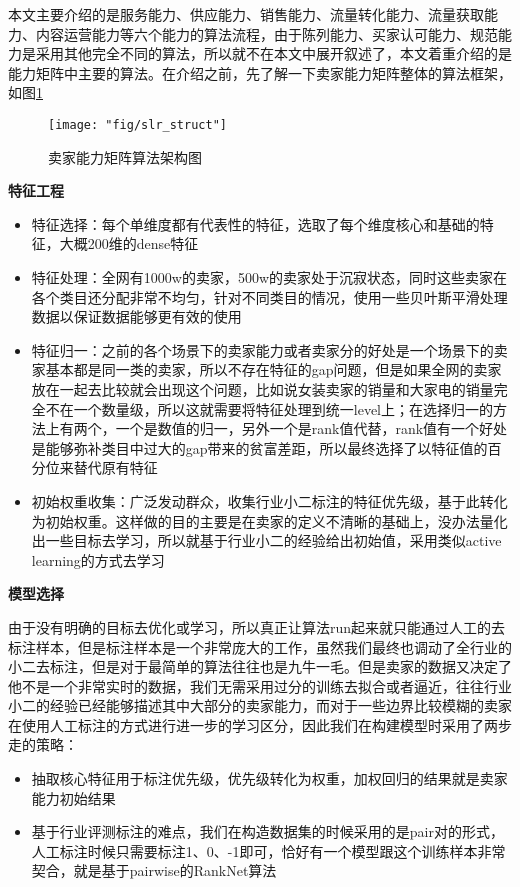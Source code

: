本文主要介绍的是服务能力、供应能力、销售能力、流量转化能力、流量获取能力、内容运营能力等六个能力的算法流程，由于陈列能力、买家认可能力、规范能力是采用其他完全不同的算法，所以就不在本文中展开叙述了，本文着重介绍的是能力矩阵中主要的算法。在介绍之前，先了解一下卖家能力矩阵整体的算法框架，如图\ref{fig:slr_struct}
\begin{figure}
	\centering
	\texttt{[image: "fig/slr\_struct"]}
	\caption{卖家能力矩阵算法架构图}
	\label{fig:slr_struct}
\end{figure}

\textbf{特征工程}

\begin{itemize}
	\item
	特征选择：每个单维度都有代表性的特征，选取了每个维度核心和基础的特征，大概200维的dense特征
	\item
	特征处理：全网有1000w的卖家，500w的卖家处于沉寂状态，同时这些卖家在各个类目还分配非常不均匀，针对不同类目的情况，使用一些贝叶斯平滑处理数据以保证数据能够更有效的使用
	\item
	特征归一：之前的各个场景下的卖家能力或者卖家分的好处是一个场景下的卖家基本都是同一类的卖家，所以不存在特征的gap问题，但是如果全网的卖家放在一起去比较就会出现这个问题，比如说女装卖家的销量和大家电的销量完全不在一个数量级，所以这就需要将特征处理到统一level上；在选择归一的方法上有两个，一个是数值的归一，另外一个是rank值代替，rank值有一个好处是能够弥补类目中过大的gap带来的贫富差距，所以最终选择了以特征值的百分位来替代原有特征
	\item
	初始权重收集：广泛发动群众，收集行业小二标注的特征优先级，基于此转化为初始权重。这样做的目的主要是在卖家的定义不清晰的基础上，没办法量化出一些目标去学习，所以就基于行业小二的经验给出初始值，采用类似active
	learning的方式去学习
\end{itemize}

\textbf{模型选择}

由于没有明确的目标去优化或学习，所以真正让算法run起来就只能通过人工的去标注样本，但是标注样本是一个非常庞大的工作，虽然我们最终也调动了全行业的小二去标注，但是对于最简单的算法往往也是九牛一毛。但是卖家的数据又决定了他不是一个非常实时的数据，我们无需采用过分的训练去拟合或者逼近，往往行业小二的经验已经能够描述其中大部分的卖家能力，而对于一些边界比较模糊的卖家在使用人工标注的方式进行进一步的学习区分，因此我们在构建模型时采用了两步走的策略：
\begin{itemize}
\item
抽取核心特征用于标注优先级，优先级转化为权重，加权回归的结果就是卖家能力初始结果
\item
基于行业评测标注的难点，我们在构造数据集的时候采用的是pair对的形式，人工标注时候只需要标注1、0、-1即可，恰好有一个模型跟这个训练样本非常契合，就是基于pairwise的RankNet\cite{ranknet}算法
\end{itemize}

